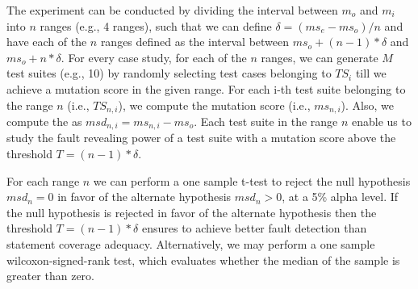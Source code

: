 The experiment can be conducted by dividing the interval between $m_o$ and $m_i$ into $n$ ranges (e.g., 4 ranges), such that we can define $\delta = (\mathit{ms}_e - \mathit{ms}_o)/n$ and have each of the $n$ ranges defined as the interval between $\mathit{ms}_o+(n-1)*\delta$ and $\mathit{ms}_o+n*\delta$.
For every case study, for each of the $n$ ranges, we can generate $M$ test suites  (e.g., 10) by randomly selecting test cases belonging to $\mathit{TS}_i$ till we achieve a mutation score in the given range.
For each i-th test suite belonging to the range $n$ (i.e., $\mathit{TS}_{n,i}$), we compute the mutation score (i.e., $ms_{n,i}$).
Also, we compute the  as $msd_{n,i}=ms_{n,i}-ms_o$. Each test suite in the range $n$ enable us to study the fault revealing power of a test suite with a mutation score above the threshold $T=(n-1)*\delta$.

For each range $n$ we can perform a one sample t-test to reject the null hypothesis $msd_{n} = 0$ in favor of the alternate hypothesis $msd_{n} > 0$, at a 5\% alpha level.
If the null hypothesis is rejected in favor of the alternate hypothesis then the threshold $T=(n-1)*\delta$ ensures to achieve better fault detection than statement coverage adequacy.
Alternatively, we may perform a one sample wilcoxon-signed-rank test, which evaluates whether the median of the sample is greater than zero.



